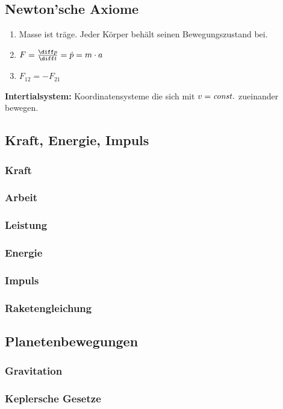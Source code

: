 \documentclass[german]{latex4ei/latex4ei_sheet}
\begin{document}
\begin{sectionbox}
\subsection{Newton'sche Axiome}
\begin{enumerate}
	\item Masse ist träge. Jeder Körper behält seinen Bewegungszustand bei.
	\item $F=\frac{\diff p}{\diff t}=\dot{p}=m\cdot a$
	\item $F_{12}=-F_{21}$
\end{enumerate}
\textbf{Intertialsystem:} Koordinatensysteme die sich mit $v=\it const.$ zueinander bewegen.
\end{sectionbox}
\subsection{Kraft, Energie, Impuls}
\subsubsection{Kraft}
\subsubsection{Arbeit}
\subsubsection{Leistung}
\subsubsection{Energie}
\subsubsection{Impuls}
\subsubsection{Raketengleichung}
\subsection{Planetenbewegungen}
\subsubsection{Gravitation}
\subsubsection{Keplersche Gesetze}
\end{document}
